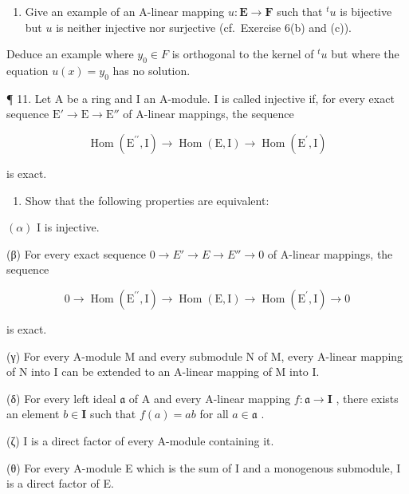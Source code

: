 \begin{enumerate}
\def\labelenumi{\arabic{enumi}.}
\setcounter{enumi}{9}
\tightlist
\item
  Give an example of an A-linear mapping \(u: \mathbf{E} \to \mathbf{F}\) such that \(^t u\) is bijective but \(u\) is neither injective nor surjective (cf.~Exercise 6(b) and (c)).
\end{enumerate}

Deduce an example where \(y_{0} \in F\) is orthogonal to the kernel of \(^{t}u\) but where the equation \(u(x) = y_{0}\) has no solution.

¶ 11. Let A be a ring and I an A-module. I is called injective if, for every exact sequence \(\mathrm{E}' \to \mathrm{E} \to \mathrm{E}''\) of A-linear mappings, the sequence

\[
\operatorname{Hom} \left(\mathrm{E} ^ {\prime \prime}, \mathrm{I}\right)\rightarrow \operatorname{Hom} (\mathrm{E}, \mathrm{I}) \rightarrow \operatorname{Hom} \left(\mathrm{E} ^ {\prime}, \mathrm{I}\right)
\]

is exact.

\begin{enumerate}
\def\labelenumi{(\alph{enumi})}
\tightlist
\item
  Show that the following properties are equivalent:
\end{enumerate}

\((\alpha)\) I is injective.

(β) For every exact sequence \(0 \rightarrow E' \rightarrow E \rightarrow E'' \rightarrow 0\) of A-linear mappings, the sequence

\[
0 \rightarrow \operatorname{Hom} (\mathrm{E} ^ {\prime \prime}, \mathrm{I}) \rightarrow \operatorname{Hom} (\mathrm{E}, \mathrm{I}) \rightarrow \operatorname{Hom} (\mathrm{E} ^ {\prime}, \mathrm{I}) \rightarrow 0
\]

is exact.

(γ) For every A-module M and every submodule N of M, every A-linear mapping of N into I can be extended to an A-linear mapping of M into I.

(δ) For every left ideal \(\mathfrak{a}\) of A and every A-linear mapping \(f: \mathfrak{a} \to \mathbf{I}\) , there exists an element \(b \in \mathbf{I}\) such that \(f(a) = ab\) for all \(a \in \mathfrak{a}\) .

(ζ) I is a direct factor of every A-module containing it.

(θ) For every A-module E which is the sum of I and a monogenous submodule, I is a direct factor of E.


